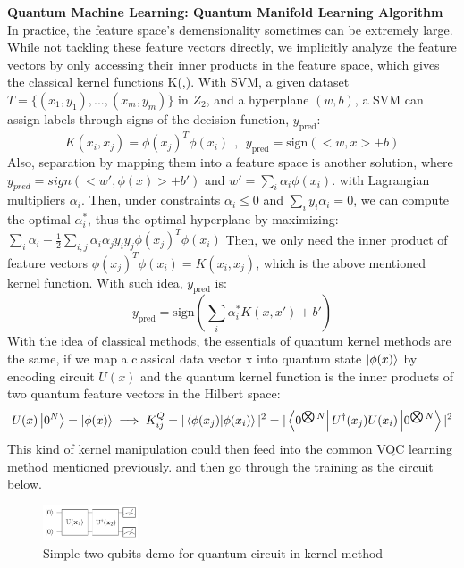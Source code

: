 \documentclass{article}
\begin{document}
\textbf{Quantum Machine Learning: Quantum Manifold Learning Algorithm}
In practice, the feature space's demensionality 
sometimes can be extremely large. While not 
tackling these feature vectors directly, we 
implicitly analyze the feature vectors by 
only accessing their inner products in the 
feature space, which gives the classical kernel functions K(,). With SVM, a given dataset 
$T = \{ (x_1, y_1), ..., (x_m, y_m)\}$ in $Z_2$, and 
a hyperplane $(w,b)$, a SVM can assign labels through
signs of the decision function, $ y_{\text{pred}}$:
\begin{equation}
  K(x_i, x_j) = \phi(x_j)^T \phi(x_i) \ \ , \ \ y_{\text{pred}} = \text{sign} ( <w,x> +b)
\end{equation}
Also, separation by mapping them into a feature space
is another solution, where $y_{pred} = sign( <w', \phi(x)> +b')$ and 
$w' = \sum_i \alpha_i \phi(x_i)$. with Lagrangian multipliers 
$\alpha_i$. Then, under constraints $\alpha_i \leq 0 $ and 
$\sum_i y_i \alpha_i = 0$, we can compute the optimal 
$\alpha_i^{*}$, thus the optimal hyperplane by maximizing: 
$
  \sum_i \alpha_i - \frac{1}{2} \sum_{i, j} \alpha_i \alpha_j y_i y_j 
  \phi(x_j)^T \phi(x_i)
$
Then, we only need the inner product of feature 
vectors $\phi(x_j)^T \phi(x_i) = K(x_i, x_j)$, which is the above 
mentioned kernel function. With such idea, $y_{\text{pred}}$ is: 
\begin{equation}
  y_{ \text{pred}} = \text{sign} ( \sum_i \alpha_i^* K(x,x') +b')
\end{equation}
With the idea of classical methods, the essentials of 
quantum kernel methods are the same, if we map a 
classical data vector x into quantum state $\ket{\phi(x)}$
by encoding circuit $U(x)$ and the quantum kernel 
function is the inner products of 
two quantum feature vectors in the Hilbert space:
\begin{equation}
  U(x) \ket{0^{N}} = \ket{\phi(x)} \implies  
  K^Q_{ij} = |\bra{\phi(x_j)} \ket{\phi(x_i) }|^2 = |\bra{0^{\bigotimes N}} U^{\dagger}(x_j) U(x_i) \ket{ 0^{\bigotimes N }} |^2
\end{equation}
This kind of kernel manipulation could then feed into 
the common VQC learning method mentioned previously.
and then go through the training as the circuit below. 
\begin{figure}[h]
  \begin{center}
    \includegraphics[width=0.25\textwidth]{kernel.png}    
  \end{center}
  \caption{Simple two qubits demo for quantum circuit in kernel method}
\end{figure}
\end{document}
